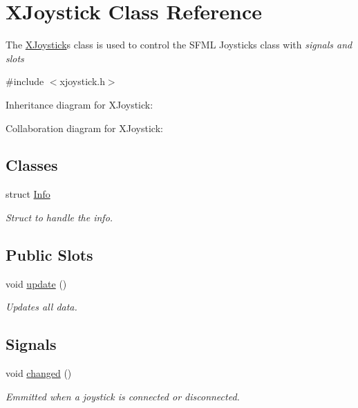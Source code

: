 \hypertarget{class_x_joystick}{}\section{X\+Joystick Class Reference}
\label{class_x_joystick}


The \hyperlink{class_x_joystick}{X\+Joystick}\textquotesingle{}s class is used to control the S\+F\+M\+L Joystick\textquotesingle{}s class with {\itshape signals and slots}  




{\ttfamily \#include $<$xjoystick.\+h$>$}



Inheritance diagram for X\+Joystick\+:


Collaboration diagram for X\+Joystick\+:
\subsection*{Classes}
\begin{DoxyCompactItemize}
\item 
struct \hyperlink{struct_x_joystick_1_1_info}{Info}
\begin{DoxyCompactList}\small\item\em Struct to handle the info. \end{DoxyCompactList}\end{DoxyCompactItemize}
\subsection*{Public Slots}
\begin{DoxyCompactItemize}
\item 
\hypertarget{class_x_joystick_a2052bd66345c8447a91902289ec6516f}{}void \hyperlink{class_x_joystick_a2052bd66345c8447a91902289ec6516f}{update} ()\label{class_x_joystick_a2052bd66345c8447a91902289ec6516f}

\begin{DoxyCompactList}\small\item\em Updates all data. \end{DoxyCompactList}\end{DoxyCompactItemize}
\subsection*{Signals}
\begin{DoxyCompactItemize}
\item 
\hypertarget{class_x_joystick_a46cf0117954ff155a3b55e9125e0b8d3}{}void \hyperlink{class_x_joystick_a46cf0117954ff155a3b55e9125e0b8d3}{changed} ()\label{class_x_joystick_a46cf0117954ff155a3b55e9125e0b8d3}

\begin{DoxyCompactList}\small\item\em Emmitted when a joystick is connected or disconnected. \end{DoxyCompactList}\end{DoxyCompactItemize}
